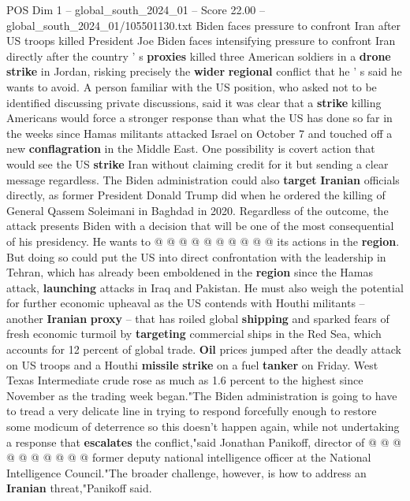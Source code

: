 \begin{textsample}{POS Dim 1 – global\_south\_2024\_01 – Score 22.00 – global\_south\_2024\_01/105501130.txt}  \label{ex:f1_pos_110}
Biden faces pressure to confront Iran after US troops killed President Joe Biden faces intensifying pressure to confront Iran directly after the country ' s \textbf{proxies} killed three American soldiers in a \textbf{drone} \textbf{strike} in Jordan, risking precisely the \textbf{wider} \textbf{regional} conflict that he ' s said he wants to avoid.
A person familiar with the US position, who asked not to be identified discussing private discussions, said it was clear that a \textbf{strike} killing Americans would force a stronger response than what the US has done so far in the weeks since Hamas militants attacked Israel on October 7 and touched off a new \textbf{conflagration} in the Middle East.
One possibility is covert action that would see the US \textbf{strike} Iran without claiming credit for it but sending a clear message regardless.
The Biden administration could also \textbf{target} \textbf{Iranian} officials directly, as former President Donald Trump did when he ordered the killing of General Qassem Soleimani in Baghdad in 2020.
Regardless of the outcome, the attack presents Biden with a decision that will be one of the most consequential of his presidency.
He wants to @ @ @ @ @ @ @ @ @ @ its actions in the \textbf{region}.
But doing so could put the US into direct confrontation with the leadership in Tehran, which has already been emboldened in the \textbf{region} since the Hamas attack, \textbf{launching} attacks in Iraq and Pakistan.
He must also weigh the potential for further economic upheaval as the US contends with Houthi militants -- another \textbf{Iranian} \textbf{proxy} -- that has roiled global \textbf{shipping} and sparked fears of fresh economic turmoil by \textbf{targeting} commercial ships in the Red Sea, which accounts for 12 percent of global trade. \textbf{Oil} prices jumped after the deadly attack on US troops and a Houthi \textbf{missile} \textbf{strike} on a fuel \textbf{tanker} on Friday.
West Texas Intermediate crude rose as much as 1.6 percent to the highest since November as the trading week began."The Biden administration is going to have to tread a very delicate line in trying to respond forcefully enough to restore some modicum of deterrence so this doesn't happen again, while not undertaking a response that \textbf{escalates} the conflict,"said Jonathan Panikoff, director of @ @ @ @ @ @ @ @ @ @ former deputy national intelligence officer at the National Intelligence Council."The broader challenge, however, is how to address an \textbf{Iranian} threat,"Panikoff said.

\end{textsample}

